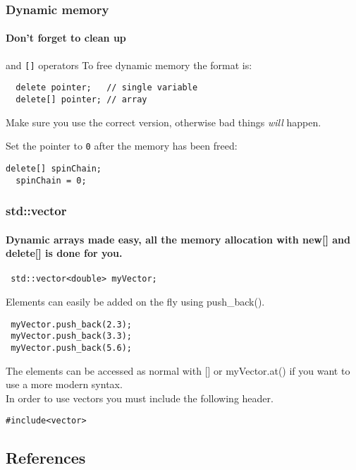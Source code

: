 \documentclass{beamer}
\begin{document}
\begin{frame}[fragile]
  \frametitle{Dynamic memory}
  \framesubtitle{Don't forget to clean up}
  
  \begin{block}{ and \texttt{[]} operators}
    To free dynamic memory the format is:
    \begin{lstlisting}
  delete pointer;   // single variable
  delete[] pointer; // array
    \end{lstlisting}
    Make sure you use the correct version, otherwise bad things \textit{will} happen.
  \end{block}
  \pause
  \pause
  \begin{doblocke}
  Set the pointer to \texttt{0} after the memory has been freed:
  \begin{lstlisting}[belowskip=0pt]
  delete[] spinChain;
  spinChain = 0;
  \end{lstlisting}
  \end{doblocke}
\end{frame}

\begin{frame}[fragile]
	\frametitle{std::vector}
	\framesubtitle{Dynamic arrays made easy, all the memory allocation with new[] and delete[] is done for you.}
	\begin{lstlisting}
 std::vector<double> myVector;
	\end{lstlisting}
	\pause Elements can easily be added on the fly using push\_back().
	\begin{lstlisting}
 myVector.push_back(2.3);
 myVector.push_back(3.3);
 myVector.push_back(5.6);
	\end{lstlisting}
	\pause The elements can be accessed as normal with [] or myVector.at() if you want to use a more modern syntax.\\[5mm] \pause
	In order to use vectors you must include the following header. 
	\begin{lstlisting}
#include<vector>
	\end{lstlisting}
\end{frame}

\subsection{References}
\end{document}
